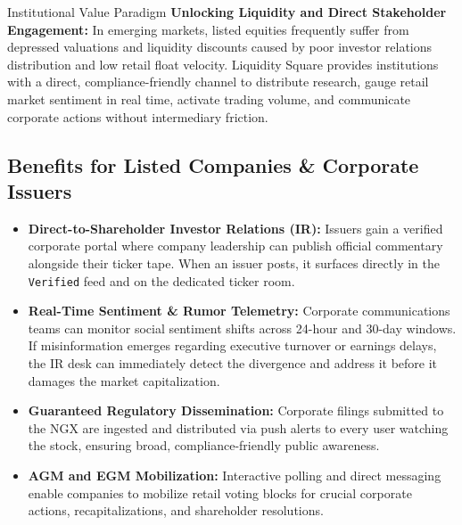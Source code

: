 \documentclass[11pt,a4paper]{article}
\begin{document}
\begin{institutionbox}{Institutional Value Paradigm}
\textbf{Unlocking Liquidity and Direct Stakeholder Engagement:}
In emerging markets, listed equities frequently suffer from depressed valuations and liquidity discounts caused by poor investor relations distribution and low retail float velocity. Liquidity Square provides institutions with a direct, compliance-friendly channel to distribute research, gauge retail market sentiment in real time, activate trading volume, and communicate corporate actions without intermediary friction.
\end{institutionbox}

\subsection{Benefits for Listed Companies \& Corporate Issuers}
\begin{itemize}
    \item \textbf{Direct-to-Shareholder Investor Relations (IR):} Issuers gain a verified corporate portal where company leadership can publish official commentary alongside their ticker tape. When an issuer posts, it surfaces directly in the \texttt{Verified} feed and on the dedicated ticker room.
    \item \textbf{Real-Time Sentiment \& Rumor Telemetry:} Corporate communications teams can monitor social sentiment shifts across 24-hour and 30-day windows. If misinformation emerges regarding executive turnover or earnings delays, the IR desk can immediately detect the divergence and address it before it damages the market capitalization.
    \item \textbf{Guaranteed Regulatory Dissemination:} Corporate filings submitted to the NGX are ingested and distributed via push alerts to every user watching the stock, ensuring broad, compliance-friendly public awareness.
    \item \textbf{AGM and EGM Mobilization:} Interactive polling and direct messaging enable companies to mobilize retail voting blocks for crucial corporate actions, recapitalizations, and shareholder resolutions.
\end{itemize}
\end{document}
